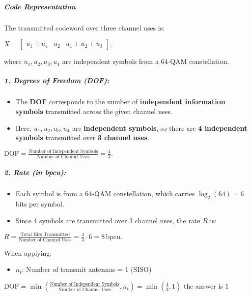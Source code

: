 \documentclass[11pt]{article}
\providecommand{\tightlist}{%
      \setlength{\itemsep}{0pt}\setlength{\parskip}{0pt}}
\begin{document}
\subparagraph{Code Representation}\label{code-representation}

The transmitted codeword over three channel uses is:

\(X = \begin{bmatrix} u_1 + u_4 & u_2 & u_1 + u_2 + u_3 \end{bmatrix},\)

where \(u_1, u_2, u_3, u_4\) are independent symbols from a 64-QAM
constellation.

\subparagraph{\texorpdfstring{1. \textbf{Degrees of Freedom
(DOF):}}{1. Degrees of Freedom (DOF):}}\label{degrees-of-freedom-dof}

\begin{itemize}
\tightlist
\item
  The \textbf{DOF} corresponds to the number of \textbf{independent
  information symbols} transmitted across the given channel uses.
\item
  Here, \(u_1, u_2, u_3, u_4\) are \textbf{independent symbols}, so
  there are \textbf{4 independent symbols} transmitted over \textbf{3
  channel uses}.
\end{itemize}

\(\text{DOF} = \frac{\text{Number of Independent Symbols}}{\text{Number of Channel Uses}} = \boxed{\frac{4}{3}}.\)

\subparagraph{\texorpdfstring{2. \textbf{Rate (in
bpcu):}}{2. Rate (in bpcu):}}\label{rate-in-bpcu}

\begin{itemize}
\tightlist
\item
  Each symbol is from a 64-QAM constellation, which carries
  \(\log_2(64) = 6\) bits per symbol.
\item
  Since 4 symbols are transmitted over 3 channel uses, the rate \(R\)
  is:
\end{itemize}

\(R = \frac{\text{Total Bits Transmitted}}{\text{Number of Channel Uses}} = \frac{4}{3}  \cdot 6 = \boxed{ 8 \, \text{bpcu}}.\)

When applying:

\begin{itemize}
\tightlist
\item
  \textbf{\(n_t\)}: Number of transmit antennas = 1 (SISO)
\end{itemize}

\(\text{DOF} = \min\left( \frac{\text{Number of Independent Symbols}}{\text{Number of Channel Uses}}, n_t \right) = \min\left( \frac{4}{3}, 1 \right)\)
the answer is \(\boxed{1}\)
\end{document}
